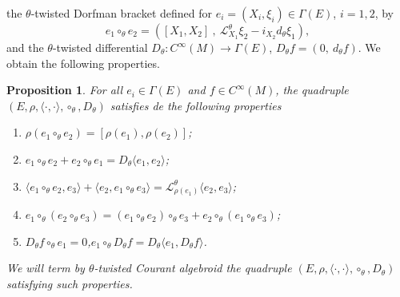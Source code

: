 \documentclass[11pt,a4paper]{article}
\theoremstyle{plain}
\newtheorem{proposition}[theorem]{Proposition}
\theoremstyle{definition}
\theoremstyle{remark}
\begin{document}
 the $\theta$-twisted Dorfman bracket defined for $e_i=(X_i,\xi_i)\in\Gamma(E)$, $i=1,2$, by
\begin{equation*}
	e_1 \circ_\theta e_2 =( [X_1,X_2]\ ,\ \mathcal{L}^\theta_{X_1} \xi_2 - i_{X_2} d_{\theta} \xi_1),
\end{equation*}
 and the $\theta$-twisted differential $D_{\theta}:C^\infty(M)\to\Gamma(E)$,
$D_{\theta}f=(0,\ d_{\theta}f).$
 We obtain the following properties.

\begin{proposition}\label{prop:Courant-theta}
 For all $e_i\in\Gamma(E)$ and $f\in C^\infty(M)$, the quadruple $(E,\rho,\langle\cdot,\cdot\rangle,\circ_\theta,D_\theta)$ satisfies de the following properties
\begin{enumerate}
\item $\rho(e_1\circ_\theta e_2) = [\rho(e_1),\rho(e_2)]$;
\item $e_1\circ_\theta e_2 + e_2\circ_\theta e_1 = D_\theta\langle e_1,e_2\rangle$;
\item $\langle e_1\circ_\theta e_2, e_3\rangle + \langle e_2, e_1\circ_\theta e_3\rangle = \mathcal{L}^\theta_{\rho(e_1)} \langle e_2,e_3\rangle$;
\item $e_1\circ_\theta (e_2\circ_\theta e_3) = (e_1\circ_\theta e_2)\circ_\theta e_3 + e_2\circ_\theta (e_1\circ_\theta e_3)$;
\item $D_\theta f \circ_\theta e_1 = 0$,\quad $e_1 \circ_\theta D_\theta f = D_\theta\langle e_1, D_\theta f\rangle$.
\end{enumerate}
We will term by \emph{$\theta$-twisted Courant algebroid } the quadruple $(E,\rho,\langle\cdot,\cdot\rangle,\circ_\theta,D_\theta)$ satisfying such properties.
\end{proposition}
\end{document}
